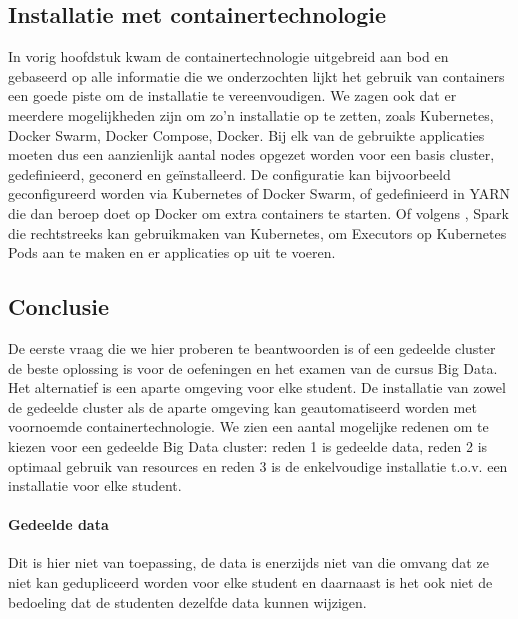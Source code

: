 \subsection{Installatie met containertechnologie}
In vorig hoofdstuk kwam de containertechnologie uitgebreid aan bod en gebaseerd op alle informatie die we onderzochten lijkt het gebruik van containers een goede piste om de installatie te vereenvoudigen.
\newline
We zagen ook dat er meerdere mogelijkheden zijn om zo'n installatie op te zetten, zoals Kubernetes, Docker Swarm, Docker Compose, Docker.
\newline
Bij elk van de gebruikte applicaties moeten dus een aanzienlijk aantal nodes opgezet worden voor een basis cluster, gedefinieerd, geconerd en geïnstalleerd.
\newline
De configuratie kan bijvoorbeeld geconfigureerd worden via Kubernetes of Docker Swarm, of gedefinieerd in YARN die dan beroep doet op Docker om extra containers te starten. Of volgens \textcite{Spark2023d}, Spark die rechtstreeks kan gebruikmaken van Kubernetes, om Executors op Kubernetes Pods aan te maken en er applicaties op uit te voeren.
\newline
\newline

\subsection{Conclusie}
De eerste vraag die we hier proberen te beantwoorden is of een gedeelde cluster de beste oplossing is voor de oefeningen en het examen van de cursus Big Data. Het alternatief is een aparte omgeving voor elke student.
\newline
De installatie van zowel de gedeelde cluster als de aparte omgeving kan geautomatiseerd worden met voornoemde containertechnologie.
\newline
We zien een aantal mogelijke redenen om te kiezen voor een gedeelde Big Data cluster: reden 1 is gedeelde data, reden 2 is optimaal gebruik van resources en reden 3 is de enkelvoudige installatie t.o.v. een installatie voor elke student.

\paragraph{Gedeelde data}
Dit is hier niet van toepassing, de data is enerzijds niet van die omvang dat ze niet kan gedupliceerd worden voor elke student en daarnaast is het ook niet de bedoeling dat de studenten dezelfde data kunnen wijzigen.

